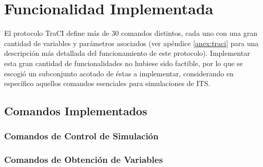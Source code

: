 \section{Funcionalidad Implementada}

El protocolo TraCI define más de 30 comandos distintos, cada uno con una gran cantidad de variables y parámetros asociados (ver apéndice \ref{anex:traci} para una descripción más detallada del funcionamiento de este protocolo). Implementar esta gran cantidad de funcionalidades no hubiese sido factible, por lo que se escogió un subconjunto acotado de éstas a implementar, considerando en específico aquellos comandos esenciales para simulaciones de ITS.

\subsection{Comandos Implementados} \label{sec:comandos}

\subsubsection{Comandos de Control de Simulación}\label{sec:comandos:controlsim}

\begin{itemize}
    \begin{multicols}{2}
    \end{multicols}
\end{itemize}

\subsubsection{Comandos de Obtención de Variables}

